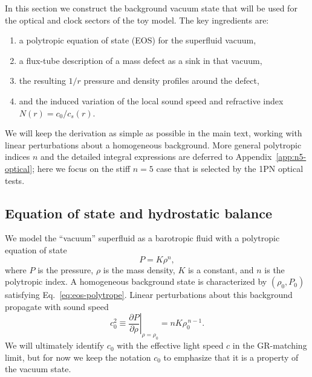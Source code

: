 \documentclass[11pt]{article}
\begin{document}
In this section we construct the background vacuum state that will
be used for the optical and clock sectors of the toy model.
The key ingredients are:

\begin{enumerate}
  \item a polytropic equation of state (EOS) for the superfluid vacuum,
  \item a flux-tube description of a mass defect as a sink in that vacuum,
  \item the resulting $1/r$ pressure and density profiles around the defect,
  \item and the induced variation of the local sound speed and refractive index
        $N(r) = c_0 / c_s(r)$.
\end{enumerate}

We will keep the derivation as simple as possible in the main text, working
with linear perturbations about a homogeneous background.  More general
polytropic indices $n$ and the detailed integral expressions are deferred to
Appendix~\ref{app:n5-optical}; here we focus on the stiff $n=5$ case that is
selected by the 1PN optical tests.


\subsection{Equation of state and hydrostatic balance}
\label{subsec:eos-hydrostatic}

We model the ``vacuum'' superfluid as a barotropic fluid with a
polytropic equation of state
\begin{equation}
  P = K \rho^n,
  \label{eq:eos-polytrope}
\end{equation}
where $P$ is the pressure, $\rho$ is the mass density, $K$ is a constant, and
$n$ is the polytropic index.
A homogeneous background state is characterized by $(\rho_0,P_0)$ satisfying
Eq.~\eqref{eq:eos-polytrope}.
Linear perturbations about this background propagate with sound speed
\begin{equation}
  c_0^2 \equiv \left.\frac{\partial P}{\partial \rho}\right|_{\rho=\rho_0}
  = n K \rho_0^{\,n-1}.
  \label{eq:c0-def}
\end{equation}
We will ultimately identify $c_0$ with the effective light speed $c$ in the
GR-matching limit, but for now we keep the notation $c_0$ to emphasize that
it is a property of the vacuum state.
\end{document}
